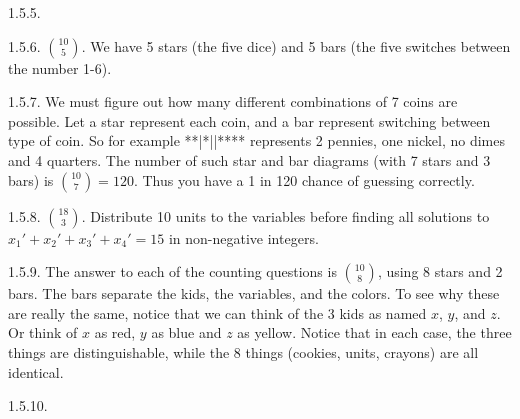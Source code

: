 \begin {itemize}
\begin{ans}{1.5.5.}
	
\end{ans}
\begin{ans}{1.5.6.}
	${10 \choose 5}$.  We have 5 stars (the five dice) and 5 bars (the five switches between the number 1-6).
	
\end{ans}
\begin{ans}{1.5.7.}
	 We must figure out how many different combinations of 7 coins are possible.  Let a star represent each coin, and a bar represent switching between type of coin.  So for example **|*||**** represents 2 pennies, one nickel, no dimes and 4 quarters.  The number of such star and bar diagrams (with 7 stars and 3 bars) is ${10 \choose 7} = 120$.  Thus you have a 1 in 120 chance of guessing correctly.
	
\end{ans}
\begin{ans}{1.5.8.}
	${18 \choose 3}$.  Distribute 10 units to the variables before finding all solutions to $x_1' + x_2' + x_3' + x_4' = 15$ in non-negative integers.
	
\end{ans}
\begin{ans}{1.5.9.}
	  The answer to each of the counting questions is ${10 \choose 8}$, using 8 stars and 2 bars.  The bars separate the kids, the variables, and the colors.  To see why these are really the same, notice that we can think of the 3 kids as named $x$, $y$, and $z$.  Or think of $x$ as red, $y$ as blue and $z$ as yellow.  Notice that in each case, the three things are distinguishable, while the 8 things (cookies, units, crayons) are all identical.
	
\end{ans}
\begin{ans}{1.5.10.}
   \begin{parts}

\end{parts}
\end{ans}
\end{itemize}
